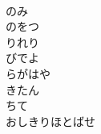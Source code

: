 \documentclass[10pt,b5j]{tarticle} %
\begin{document}
\begin{enumerate}
\begin{minipage}[c]{\blocksize}
    \end{minipage}
    \begin{minipage}[c]{\blocksize}
        
        \vspace{\linespace}
        \item~\\
        のみ\\
        のをつ\\
        りれり\\
        びでよ\\
        らがはや\\
        きたん\\
        ちて\\
        おしきりほとばせ
    
    \end{minipage}
\end{enumerate} %
\end{document}
